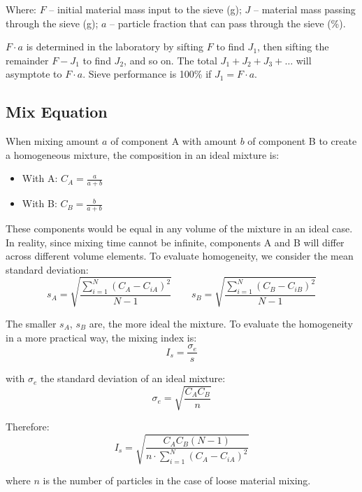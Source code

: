 Where: $F$ -- initial material mass input to the sieve (g); $J$ -- material mass passing through the sieve (g); $a$ -- particle fraction that can pass through the sieve (\%).

$F \cdot a$ is determined in the laboratory by sifting $F$ to find $J_1$, then sifting the remainder $F - J_1$ to find $J_2$, and so on. The total $J_1 + J_2 + J_3 + \ldots$ will asymptote to $F \cdot a$. Sieve performance is 100\% if $J_1 = F \cdot a$.

\subsection{Mix Equation}

When mixing amount $a$ of component A with amount $b$ of component B to create a homogeneous mixture, the composition in an ideal mixture is:
\begin{itemize}
    \item With A: $\displaystyle C_A = \frac{a}{a+b}$
    \item With B: $\displaystyle C_B = \frac{b}{a+b}$
\end{itemize}

These components would be equal in any volume of the mixture in an ideal case. In reality, since mixing time cannot be infinite, components A and B will differ across different volume elements. To evaluate homogeneity, we consider the mean standard deviation:
\begin{equation}
    s_A = \sqrt{\frac{\sum_{i=1}^{N}(C_A - C_{iA})^2}{N-1}}
    \qquad
    s_B = \sqrt{\frac{\sum_{i=1}^{N}(C_B - C_{iB})^2}{N-1}}
\end{equation}

The smaller $s_A$, $s_B$ are, the more ideal the mixture. To evaluate the homogeneity in a more practical way, the mixing index is:
\begin{equation}
    I_s = \frac{\sigma_e}{s}
\end{equation}

with $\sigma_e$ the standard deviation of an ideal mixture:
\begin{equation}
    \sigma_e = \sqrt{\frac{C_A C_B}{n}}
\end{equation}

Therefore:
\begin{equation}
    I_s = \sqrt{\frac{C_A C_B (N-1)}{n \cdot \sum_{i=1}^{N}(C_A - C_{iA})^2}}
\end{equation}

where $n$ is the number of particles in the case of loose material mixing.
